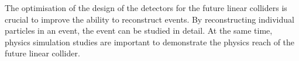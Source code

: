 The optimisation of the design of the detectors for the future linear colliders is crucial to improve the ability to reconstruct events. By reconstructing individual particles in an event, the event can be studied in detail. At the same time,  physics simulation studies are important to demonstrate the physics reach of the future linear collider.









